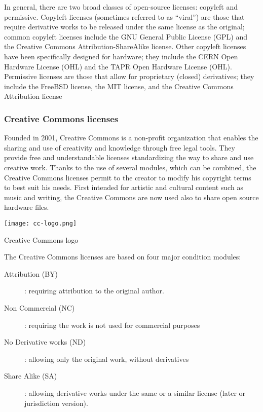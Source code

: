 In general, there are two broad classes of open-source licenses: copyleft and permissive. Copyleft licenses (sometimes referred to as “viral”) are those that require derivative works to be released under the same license as the original; common copyleft licenses include the GNU General Public License (GPL) and the Creative Commons Attribution-ShareAlike license. Other copyleft licenses have been specifically designed for hardware; they include the CERN Open Hardware License (OHL) and the TAPR Open Hardware License (OHL). Permissive licenses are those that allow for proprietary (closed) derivatives; they include the FreeBSD license, the MIT license, and the Creative Commons Attribution license


\subsubsection{Creative Commons licenses} %
\begin{row}{4}{2}
    \begin{cell}{3}
        Founded in 2001, Creative Commons is a non-profit organization that enables the sharing and use of creativity and knowledge through free legal tools. They provide free and understandable licenses standardizing the way to share and use creative work. Thanks to the use of several modules, which can be combined, the Creative Commons licenses permit to the creator to modify his copyright terms to best suit his needs. First intended for artistic and cultural content such as music and writing, the Creative Commons are now used also to share open source hardware files.
    \end{cell}
    \begin{cell}{1}
        \begin{NFfigure}
            \centering
                \texttt{[image: cc-logo.png]}
            \caption{Creative Commons logo}
            \label{fig:cc_logo}
        \end{NFfigure}
    \end{cell}
\end{row}
The Creative Commons licenses are based on four major condition modules:
\begin{description}
    \item[Attribution (BY)]: requiring attribution to the original author.
    \item[Non Commercial (NC)]: requiring the work is not used for commercial purposes
    \item[No Derivative works (ND)]: allowing only the original work, without derivatives
    \item[Share Alike (SA)]: allowing derivative works under the same or a similar license (later or jurisdiction version).
\end{description}


